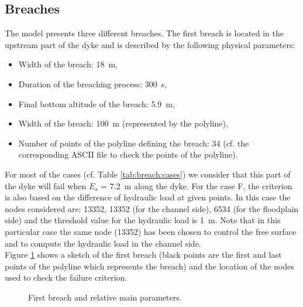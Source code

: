 \subsection{Breaches}
The model presents three different breaches.
The first breach is located in the upstream part of the dyke and is described
by the following physical parameters:
\begin{itemize}
 \item Width of the breach: 18~m,
 \item Duration of the breaching process: 300~s,
 \item Final bottom altitude of the breach: 5.9~m,
 \item Width of the breach: 100~m (represented by the polyline),
 \item Number of points of the polyline defining the breach: 34
      (cf. the corresponding ASCII file to check the points of the polyline).
\end{itemize}
For most of the cases (cf. Table \ref{tab:breach:cases}) we consider that this
part of the dyke will fail when $E_s$ = 7.2~m along the dyke.
For the case F, the criterion is also based on the difference of hydraulic load
at given points. In this case the nodes considered are: 13352, 13352 (for the
channel side), 6534 (for the floodplain side) and the threshold value for the
hydraulic load is 1~m. Note that in this particular case the same node (13352)
has been chosen to control the free surface and to compute the hydraulic load
in the channel side. \\
Figure \ref{fig:breach:points_br1} shows a sketch of the first breach (black
points are the first and last points of the polyline which represents the breach)
and the location of the nodes used to check the failure criterion.
\begin{figure}[H]
  \centering
  \caption{First breach and relative main parameters.}\label{fig:breach:points_br1}
\end{figure}

